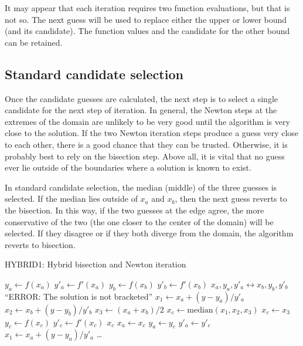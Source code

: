 It may appear that each iteration requires two function evaluations, but that is not so.  The next guess will be used to replace either the upper or lower bound (and its candidate).  The function values and the candidate for the other bound can be retained.

\subsection{Standard candidate selection}

Once the candidate guesses are calculated, the next step is to select a single candidate for the next step of iteration.  In general, the Newton steps at the extremes of the domain are unlikely to be very good until the algorithm is very close to the solution.  If the two Newton iteration steps produce a guess very close to each other, there is a good chance that they can be trusted.  Otherwise, it is probably best to rely on the bisection step.  Above all, it is vital that no guess ever lie outside of the boundaries where a solution is known to exist.

In standard candidate selection, the median (middle) of the three guesses is selected.  If the median lies outside of $x_a$ and $x_b$, then the next guess reverts to the bisection.  In this way, if the two guesses at the edge agree, the more conservative of the two (the one closer to the center of the domain) will be selected.  If they disagree or if they both diverge from the domain, the algorithm reverts to bisection.

\begin{algorithm}
\caption{HYBRID1: Hybrid bisection and Newton iteration}\label{alg:hybrid1}
\begin{algorithmic}
\State $y_a \gets f(x_a)$   
\State $y'_a \gets f'(x_a)$
\State $y_b \gets f(x_b)$
\State $y'_b \gets f'(x_b)$
    \State $x_a,y_a,y'_a \leftrightarrow x_b,y_b,y'_b$  
\EndIf
{}
    \State \Return ``ERROR: The solution is not bracketed''
\EndIf
\State $x_1 \gets x_a + (y-y_a)/y'_a$   
\State $x_2 \gets x_b + (y-y_b)/y'_b$
\State $x_3 \gets (x_a + x_b)/2$
     
    \State $x_c \gets \mathrm{median}(x_1,x_2,x_3)$ 
     
        \State $x_c \gets x_3$ 
    \EndIf
    \State $y_c \gets f(x_c)$ 
    \State $y'_c\gets f'(x_c)$ 
     
        \State \Return $x_c$
    \EndIf
     
        \State $x_a \gets x_c$ 
        \State $y_a \gets y_c$
        \State $y'_a \gets y'_c$
        \State $x_1 \gets x_a + (y - y_a)/y'_a$ 
        \State \ldots
{}
\end{algorithmic}
\end{algorithm}

